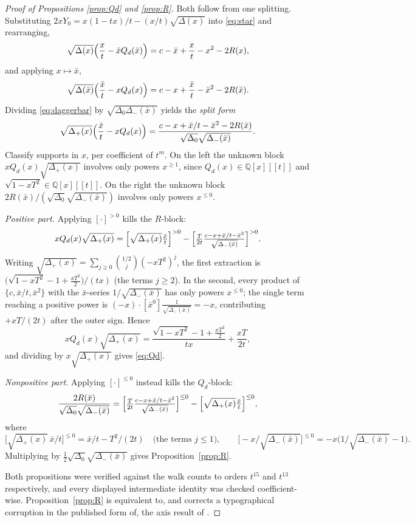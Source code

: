\documentclass[11pt]{article}
\theoremstyle{definition}
\newcommand{\bx}{\bar x}\newcommand{\by}{\bar y}
\begin{document}
\begin{proof}[Proof of Propositions \ref{prop:Qd} and \ref{prop:R}]
Both follow from one splitting. Substituting
$2xY_0=x(1-tx)/t-(x/t)\sqrt{\Delta(x)}$ into \eqref{eq:star} and rearranging,
\begin{equation}\label{eq:dagger}
  \sqrt{\Delta(x)}\Bigl(\frac{x}{t}-\bx Q_d(\bx)\Bigr)
  =c-\bx+\frac{x}{t}-x^{2}-2R(x),
\end{equation}
and applying $x\mapsto\bx$,
\begin{equation}\label{eq:daggerbar}
  \sqrt{\Delta(\bx)}\Bigl(\frac{\bx}{t}-xQ_d(x)\Bigr)
  =c-x+\frac{\bx}{t}-\bx^{2}-2R(\bx).
\end{equation}
Dividing \eqref{eq:daggerbar} by $\sqrt{\Delta_0\Delta_-(\bx)}$ yields the
\emph{split form}
\begin{equation}\label{eq:split}
  \sqrt{\Delta_+(x)}\Bigl(\frac{\bx}{t}-xQ_d(x)\Bigr)
  =\frac{c-x+\bx/t-\bx^{2}-2R(\bx)}{\sqrt{\Delta_0}\sqrt{\Delta_-(\bx)}}.
\end{equation}
Classify supports in $x$, per coefficient of $t^{m}$. On the left the unknown
block $xQ_d(x)\sqrt{\Delta_+(x)}$ involves only powers $x^{\ge1}$, since
$Q_d(x)\in\mathbb{Q}[x][[t]]$ and $\sqrt{1-xT^{2}}\in\mathbb{Q}[x][[t]]$. On
the right the unknown block $2R(\bx)/(\sqrt{\Delta_0}\sqrt{\Delta_-(\bx)})$
involves only powers $x^{\le0}$.

\emph{Positive part.} Applying $[\cdot]^{>0}$ kills the $R$-block:
\[
  xQ_d(x)\sqrt{\Delta_+(x)}
  =\Bigl[\sqrt{\Delta_+(x)}\tfrac{\bx}{t}\Bigr]^{>0}
   -\Bigl[\tfrac{T}{2t}\tfrac{c-x+\bx/t-\bx^{2}}{\sqrt{\Delta_-(\bx)}}\Bigr]^{>0}.
\]
Writing $\sqrt{\Delta_+(x)}=\sum_{j\ge0}\binom{1/2}{j}(-xT^{2})^{j}$, the first
extraction is $\bigl(\sqrt{1-xT^{2}}-1+\tfrac{xT^{2}}{2}\bigr)/(tx)$ (the terms
$j\ge2$). In the second, every product of $\{c,\bx/t,\bx^{2}\}$ with the
$\bx$-series $1/\sqrt{\Delta_-(\bx)}$ has only powers $x^{\le0}$; the single
term reaching a positive power is
$(-x)\cdot[\bx^{0}]\tfrac{1}{\sqrt{\Delta_-(\bx)}}=-x$, contributing
$+xT/(2t)$ after the outer sign. Hence
\[
  xQ_d(x)\sqrt{\Delta_+(x)}
  =\frac{\sqrt{1-xT^{2}}-1+\tfrac{xT^{2}}{2}}{tx}+\frac{xT}{2t},
\]
and dividing by $x\sqrt{\Delta_+(x)}$ gives \eqref{eq:Qd}.

\emph{Nonpositive part.} Applying $[\cdot]^{\le0}$ instead kills the
$Q_d$-block:
\[
  \frac{2R(\bx)}{\sqrt{\Delta_0}\sqrt{\Delta_-(\bx)}}
  =\Bigl[\tfrac{T}{2t}\tfrac{c-x+\bx/t-\bx^{2}}{\sqrt{\Delta_-(\bx)}}\Bigr]^{\le0}
   -\Bigl[\sqrt{\Delta_+(x)}\tfrac{\bx}{t}\Bigr]^{\le0},
\]
where
\[
  \bigl[\sqrt{\Delta_+(x)}\,\bx/t\bigr]^{\le0}=\bx/t-T^{2}/(2t)
  \quad\text{(the terms $j\le1$)},\qquad
  \bigl[-x/\sqrt{\Delta_-(\bx)}\bigr]^{\le0}
   =-x\bigl(1/\sqrt{\Delta_-(\bx)}-1\bigr).
\]
Multiplying by
$\tfrac12\sqrt{\Delta_0}\sqrt{\Delta_-(\bx)}$ gives
Proposition~\ref{prop:R}.

Both propositions were verified against the walk counts to orders $t^{15}$ and
$t^{13}$ respectively, and every displayed intermediate identity was checked
coefficient-wise. Proposition~\ref{prop:R} is equivalent to, and corrects a
typographical corruption in the published form of, the axis result of
\cite{Mishna}.
\end{proof}
\end{document}
